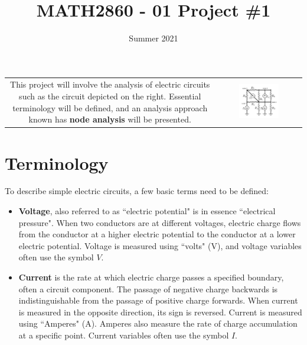 \documentclass{article}
\title{MATH2860 - 01 Project \#1}
\date{Summer 2021}
\begin{document}
\maketitle

\begin{tabular}{cc}
\parbox{0.5\textwidth}{
This project will involve the analysis of electric circuits such as the circuit depicted on the right. Essential terminology will be defined, and an analysis approach known has {\bf node analysis} will be presented. 
} & \parbox{0.5\textwidth}{
\includegraphics[width = 0.5\textwidth]{complex_circuit_3}
}
\end{tabular}




\section{Terminology}

To describe simple electric circuits, a few basic terms need to be defined:
\begin{itemize}
\item {\bf Voltage}, also referred to as ``electric potential" is in essence ``electrical pressure". When two conductors are at different voltages, electric charge flows from the conductor at a higher electric potential to the conductor at a lower electric potential. Voltage is measured using ``volts" (V), and voltage variables often use the symbol \(V\).
\item {\bf Current} is the rate at which electric charge passes a specified boundary, often a circuit component. The passage of negative charge backwards is indistinguishable from the passage of positive charge forwards. When current is measured in the opposite direction, its sign is reversed. Current is measured using ``Amperes" (A). Amperes also measure the rate of charge accumulation at a specific point. Current variables often use the symbol \(I\).
\end{itemize}
\end{document}

